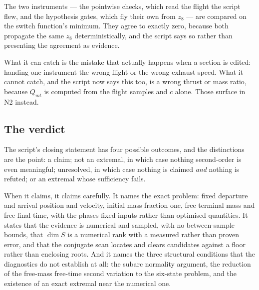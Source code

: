\documentclass[11pt]{article}
\newcommand{\Qmt}{Q_{mt}}
\begin{document}
\begin{intu}
The two instruments --- the pointwise checks, which read the flight the script
flew, and the hypothesis gates, which fly their own from $z_8$ --- are compared
on the switch function's minimum. They agree to exactly zero, because both
propagate the same $z_8$ deterministically, and the script says so rather than
presenting the agreement as evidence.

What it can catch is the mistake that actually happens when a section is
edited: handing one instrument the wrong flight or the wrong exhaust speed.
What it cannot catch, and the script now says this too, is a wrong thrust or
mass ratio, because $\Qmt$ is computed from the flight samples and $c$ alone.
Those surface in N2 instead.
\end{intu}

\subsection{The verdict}\label{sec:verdict}

\begin{intu}
The script's closing statement has four possible outcomes, and the distinctions
are the point: a claim; not an extremal, in which case nothing second-order is
even meaningful; unresolved, in which case nothing is claimed \emph{and} nothing
is refuted; or an extremal whose sufficiency fails.

When it claims, it claims carefully. It names the exact problem: fixed
departure and arrival position and velocity, initial mass fraction one, free
terminal mass and free final time, with the phases fixed inputs rather than
optimised quantities. It states that the evidence is numerical and sampled,
with no between-sample bounds, that $\dim S$ is a numerical rank with a measured
rather than proven error, and that the conjugate scan locates and clears
candidates against a floor rather than enclosing roots. And it names the three
structural conditions that the diagnostics do not establish at all: the subarc
normality argument, the reduction of the free-mass free-time second variation to
the six-state problem, and the existence of an exact extremal near the numerical
one.
\end{intu}
\end{document}
